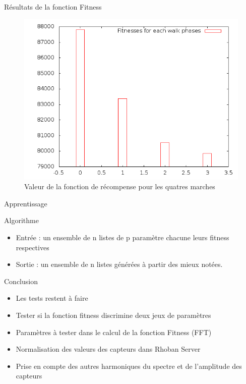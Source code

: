 \documentclass{beamer}
\begin{document}
\begin{frame}{Résultats de la fonction Fitness}
    \begin{figure}[h]
        \includegraphics[scale=0.4]{../report/fitnesses.png}
        \caption{Valeur de la fonction de récompense pour les quatres marches}
    \end{figure}
\end{frame}

\begin{frame}{Apprentissage}
    \begin{block}{Algorithme }
        \begin{itemize}
            \item Entrée : un ensemble de n listes de p paramètre chacune
                    leurs fitness respectives
            \item Sortie : un ensemble de n listes générées à partir des mieux notées.   
        \end{itemize}
    \end{block}
\end{frame}

\begin{frame}{Conclusion}
    \begin{itemize}
        \item Les tests restent à faire
        \item Tester si la fonction fitness discrimine deux jeux de paramètres
        \item Paramètres à tester dans le calcul de la fonction Fitness (FFT)
        \item Normalisation des valeurs des capteurs dans Rhoban Server
        \item Prise en compte des autres harmoniques du spectre et de l'amplitude
            des capteurs
    \end{itemize}
\end{frame}
\end{document}
